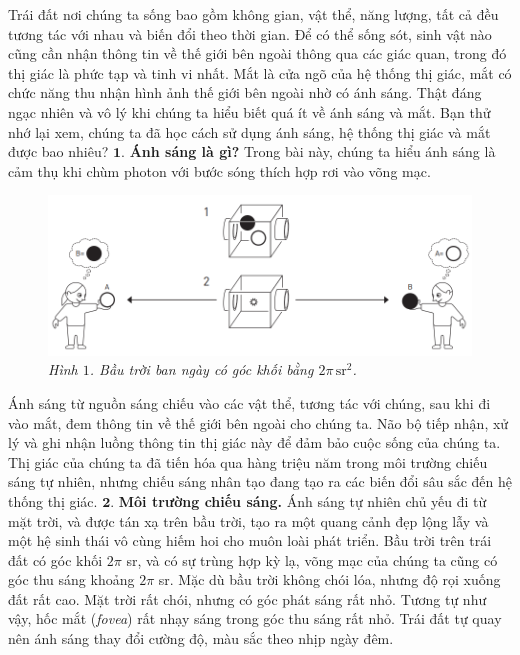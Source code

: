 \begin{multicols}{2}
	Trái đất nơi chúng ta sống bao gồm không gian, vật thể, năng lượng, tất cả đều tương tác với nhau và biến đổi theo thời gian. Để có thể sống sót, sinh vật nào cũng cần nhận thông tin về thế giới bên ngoài thông qua các giác quan, trong đó thị giác là phức tạp và tinh vi nhất. Mắt là cửa ngõ của hệ thống thị giác, mắt có chức năng thu nhận hình ảnh thế giới bên ngoài nhờ có ánh sáng.
	\vskip 0.1cm
	Thật đáng ngạc nhiên và vô lý khi chúng ta hiểu biết quá ít về ánh sáng và mắt. Bạn thử nhớ lại xem, chúng ta đã học cách sử dụng ánh sáng, hệ thống thị giác và mắt được bao nhiêu? 
	\vskip 0.1cm
	$\pmb{1.}$ \textbf{\color{timhieukhoahoc}Ánh sáng là gì?}
	\vskip 0.1cm
	Trong bài này, chúng ta hiểu ánh sáng là cảm thụ khi chùm photon với bước sóng thích hợp rơi vào võng mạc. 
	\begin{figure}[H]
		\vspace*{-5pt}
		\centering
		\captionsetup{labelformat= empty, justification=centering}
		\includegraphics[width= 0.85\linewidth]{1}
		\hspace*{-10pt}\caption{\small\textit{\color{timhieukhoahoc}Hình $1$. Bầu trời ban ngày có góc khối bằng $2\pi\,\text{sr}^2$.}}
		\vspace*{-10pt}
	\end{figure}
	Ánh sáng từ nguồn sáng chiếu vào các vật thể, tương tác với chúng, sau khi đi vào mắt, đem thông tin về thế giới bên ngoài cho chúng ta. Não bộ tiếp nhận, xử lý và ghi nhận luồng thông tin thị giác này để đảm bảo cuộc sống của chúng ta. Thị giác của chúng ta đã tiến hóa qua hàng triệu năm trong môi trường chiếu sáng tự nhiên, nhưng chiếu sáng nhân tạo đang tạo ra các biến đổi sâu sắc đến hệ thống thị giác.
	\vskip 0.1cm
	$\pmb{2.}$	\textbf{\color{timhieukhoahoc}Môi trường chiếu sáng.}
	\vskip 0.1cm
	Ánh sáng tự nhiên chủ yếu đi từ mặt trời, và được tán xạ trên bầu trời, tạo ra một quang cảnh đẹp lộng lẫy và một hệ sinh thái vô cùng hiếm hoi cho muôn loài phát triển.
	\vskip 0.1cm
	Bầu trời trên trái đất có góc khối $2\pi$ sr, và có sự trùng hợp kỳ lạ, võng mạc của chúng ta cũng có góc thu sáng khoảng $2\pi$ sr. Mặc dù bầu trời không chói lóa, nhưng độ rọi xuống đất rất cao. Mặt trời rất chói, nhưng có góc phát sáng rất nhỏ. Tương tự như vậy, hốc mắt (\textit{fovea}) rất nhạy sáng trong góc thu sáng rất nhỏ. Trái đất tự quay nên ánh sáng thay đổi cường độ, màu sắc theo nhịp ngày đêm.

\end{multicols}
